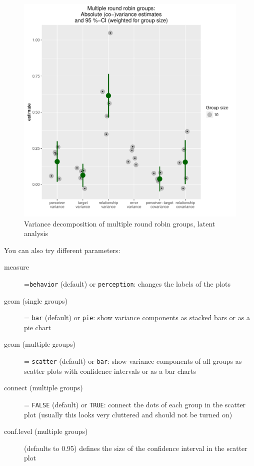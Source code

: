 \documentclass[a4paper]{article}\usepackage[]{graphicx}\usepackage[]{color}
\makeatletter
\def\maxwidth{ %
  \ifdim\Gin@nat@width>\linewidth
    \linewidth
  \else
    \Gin@nat@width
  \fi
}
\newenvironment{knitrout}{}{} %
\makeatother
\begin{document}
\begin{figure} 
\begin{center} 
\begin{knitrout}\small
{}\color{fgcolor}
\includegraphics[width=\maxwidth]{Sweave-Files/Sw_unnamed-chunk-23-1} 

\end{knitrout}
\end{center}
\caption{Variance decomposition of multiple round robin groups, latent analysis}
\label{fig:two}
\end{figure}


You can also try different parameters:
\begin{description}
	\item[measure] =\texttt{behavior} (default) or \texttt{perception}: changes the labels of the plots
	\item[geom (single groups)] = \texttt{bar} (default) or \texttt{pie}: show variance components as stacked bars or as a pie chart
	\item[geom (multiple groups)] = \texttt{scatter} (default) or \texttt{bar}: show variance components of all groups as scatter plots with confidence intervals or as a bar charts
	\item[connect (multiple groups)] = \texttt{FALSE} (default) or \texttt{TRUE}: connect the dots of each group in the scatter plot (usually this looks very cluttered and should not be turned on)
	\item[conf.level (multiple groups)] (defaults to 0.95) defines the size of the confidence interval in the scatter plot
\end{description}
\end{document}
